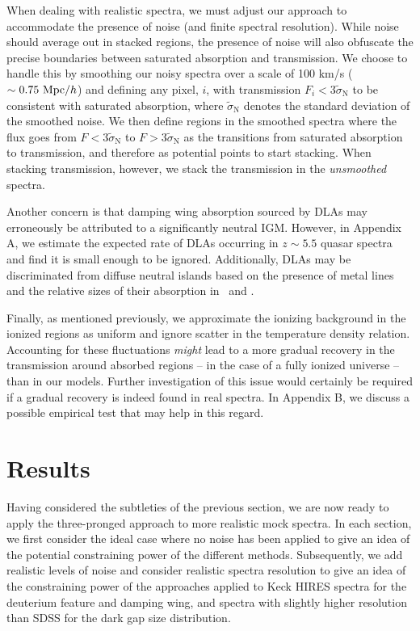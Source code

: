 When dealing with realistic spectra, we must adjust our approach to accommodate the presence of noise (and finite spectral resolution). While noise should average out in stacked regions, the presence of noise will also obfuscate the precise boundaries between saturated absorption and transmission. We choose to handle this by smoothing our noisy spectra over a scale of 100 km/s ($\sim 0.75\ \text{Mpc/$h$}$) and defining any pixel, $i$, with transmission $F_i < 3\tilde{\sigma}_{\text{N}}$ to be consistent with saturated absorption, where $\tilde{\sigma}_{\text{N}}$ denotes the standard deviation of the smoothed noise. We then define regions in the smoothed spectra where the flux goes from $F<3\tilde{\sigma}_{\text{N}}$ to $F>3\tilde{\sigma}_{\text{N}}$ as the transitions from saturated absorption to transmission, and therefore as potential points to start stacking. When stacking transmission, however, we stack the transmission in the \textit{unsmoothed} spectra.

Another concern is that damping wing absorption sourced by DLAs may erroneously be attributed to a significantly neutral IGM. However, in Appendix A, we estimate the expected rate of DLAs occurring in $z \sim 5.5$ quasar spectra and find it is small enough to be ignored. Additionally, DLAs may be discriminated from diffuse neutral islands based on the presence of metal lines and the relative sizes of their absorption in \lya\ and \lyb. 

Finally, as mentioned previously, we approximate the ionizing background in the ionized regions as uniform and ignore scatter in the temperature density relation. Accounting for these fluctuations {\em might}
lead to a more gradual recovery in the transmission around absorbed regions -- in the case of a fully ionized universe -- than in our models. Further investigation of this issue would certainly be required if a gradual recovery
is indeed found in real spectra. In Appendix B, we discuss a possible empirical test that may help in this regard.



\section{Results} \label{sec:NeutralIslandsResults}


Having considered the subtleties of the previous section, we are now ready to apply the three-pronged approach to more realistic mock spectra. In each section, we first consider the ideal case where no noise has been applied to give an idea of the potential constraining power of the different methods. Subsequently, we add realistic levels of noise and consider realistic spectra resolution to give an idea of the constraining power of the approaches applied to Keck HIRES spectra for the deuterium feature and damping wing, and spectra with slightly higher resolution than SDSS for the dark gap size distribution.


